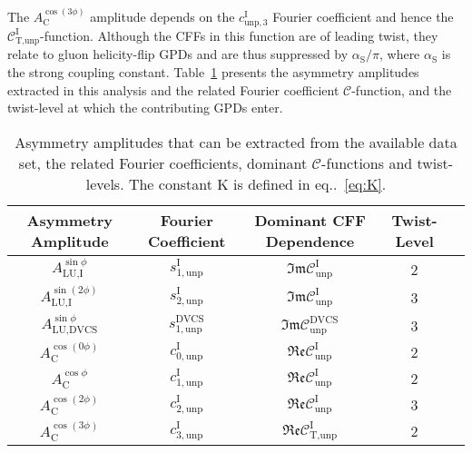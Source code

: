 The $A^{\cos(3\phi)}_{\textrm{C}}$ amplitude depends on the
$c_{\textrm{unp},3}^{\textrm{I}}$ Fourier coefficient and hence the
$\mathcal{C}_{\textrm{T,unp}}^{\textrm{I}}$-function. Although the CFFs
in this function are of leading twist, they relate to gluon helicity-flip GPDs and are thus suppressed by $\alpha_{\textrm{S}}/\pi$, where $\alpha_{\textrm{S}}$ is the strong coupling constant. Table~\ref{tab_amplitudes} presents the asymmetry amplitudes extracted in this analysis and the
related  Fourier coefficient  $\mathcal{C}$-function, and the twist-level at which the contributing GPDs enter.
\begin{table}
\begin{center}
\resizebox{\textwidth}{!} {
\begin{tabular}{|c|c|c|c|c|}
\hline
Asymmetry Amplitude& Fourier Coefficient& Dominant CFF Dependence & Twist-Level   \\ 
\hline
\hline
$A_{\textrm{LU,I}}^{\sin\phi}$ & $s_{1,\textrm{unp}}^{\textrm{I}}$  &
$\mathfrak{Im}\mathcal{C}_{\textrm{unp}}^{\textrm{I}}$
&  2 \\
\hline
$A_{\textrm{LU,I}}^{\sin(2\phi)}$ & $s_{2,\textrm{unp}}^{\textrm{I}}$ 
&
$\mathfrak{Im}\mathcal{C}_{\textrm{unp}}^{\textrm{I}}$
&  3 \\
\hline
\hline
$A_{\textrm{LU,DVCS}}^{\sin\phi}$ & $s_{1, \textrm{unp}}^{\textrm{DVCS}}$ &
$\mathfrak{Im}\mathcal{C}_{\textrm{unp}}^{\textrm{DVCS}}$ &  3 \\
\hline
\hline
$A_{\textrm{C}}^{\cos(0\phi)}$ & $c_{0,\textrm{unp}}^{\textrm{I}}$  &
$\mathfrak{Re}\mathcal{C}_{\textrm{unp}}^{\textrm{I}}$ & 2
\\
\hline
$A_{\textrm{C}}^{\cos\phi}$ & $c_{1,\textrm{unp}}^{\textrm{I}}$  &
$\mathfrak{Re}\mathcal{C}_{\textrm{unp}}^{\textrm{I}}$ & 2
\\
\hline
$A_{\textrm{C}}^{\cos(2\phi)}$ & $c_{2,\textrm{unp}}^{\textrm{I}}$ &
$\mathfrak{Re}\mathcal{C}_{\textrm{unp}}^{\textrm{I}}$ & 3 \\
\hline
$A_{\textrm{C}}^{\cos(3\phi)}$ & $c_{3,\textrm{unp}}^{\textrm{I}}$ &
$\mathfrak{Re}\mathcal{C}_{\textrm{T,unp}}^{\textrm{I}}$ &  2 \\
\hline
 \end{tabular}
}
\caption{Asymmetry amplitudes that can
be extracted from the available data set, the related Fourier
coefficients, dominant $\mathcal{C}$-functions and twist-levels. {The constant K is defined in eq..~\ref{eq:K}}.}
\label{tab_amplitudes}
\end{center}
\end{table}
 
